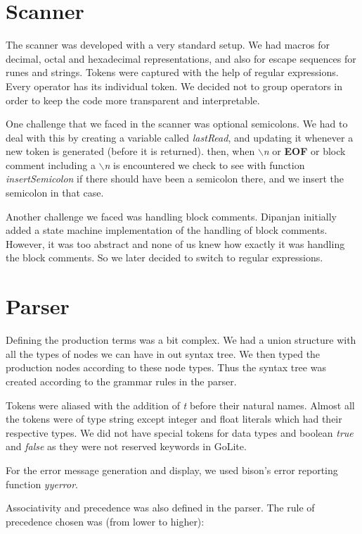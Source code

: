 \documentclass[preprint,12pt]{elsarticle}
\begin{document}
\section{Scanner}

The scanner was developed with a very standard setup. We had macros for decimal, octal and hexadecimal representations, and also for escape sequences for runes and strings. Tokens were captured with the help of regular expressions. Every operator has its individual token. We decided not to group operators in order to keep the code more transparent and interpretable.

One challenge that we faced in the scanner was optional semicolons. We had to deal with this by creating a variable called \textit{lastRead}, and updating it whenever a new token is generated (before it is returned). then, when \textit{$\backslash$n} or \textbf{EOF} or block comment including a \textit{$\backslash$n} is encountered we check to see with function \textit{insertSemicolon} if there should have been a semicolon there, and we insert the semicolon in that case.

Another challenge we faced was handling block comments. Dipanjan initially added a state machine implementation of the handling of block comments. However, it was too abstract and none of us knew how exactly it was handling the block comments. So we later decided to switch to regular expressions.

\section{Parser}

Defining the production terms was a bit complex. We had a union structure with all the types of nodes we can have in out syntax tree. We then typed the production nodes according to these node types. Thus the syntax tree was created according to the grammar rules in the parser.

Tokens were aliased with the addition of \textit{t} before their natural names. Almost all the tokens were of type string except integer and float literals which had their respective types. We did not have special tokens for data types and boolean \textit{true} and \textit{false} as they were not reserved keywords in GoLite.

For the error message generation and display, we used bison's error reporting function \textit{yyerror}. 

Associativity and precedence was also defined in the parser. The rule of precedence chosen was (from lower to higher):
\end{document}
